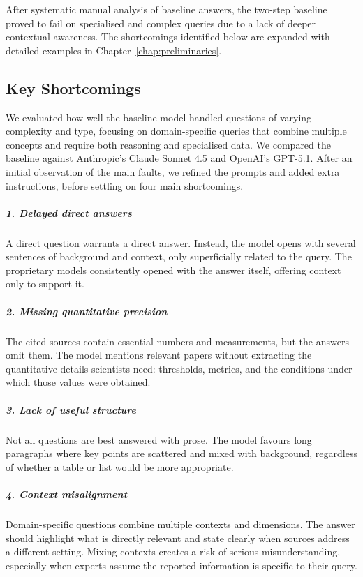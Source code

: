 After systematic manual analysis of baseline answers, the two-step baseline~\citep{elbaff2025earthobservationrag} proved to fail on specialised and complex queries due to a lack of deeper contextual awareness. The shortcomings identified below are expanded with detailed examples in Chapter~\ref{chap:preliminaries}.

\subsection{Key Shortcomings}
\label{subsec:shortcomings}

We evaluated how well the baseline model handled questions of varying complexity and type, focusing on domain-specific queries that combine multiple concepts and require both reasoning and specialised data. We compared the baseline against Anthropic's Claude Sonnet 4.5 and OpenAI's GPT-5.1. After an initial observation of the main faults, we refined the prompts and added extra instructions, before settling on four main shortcomings.

\subparagraph{1. Delayed direct answers}

A direct question warrants a direct answer. Instead, the model opens with several sentences of background and context, only superficially related to the query. The proprietary models consistently opened with the answer itself, offering context only to support it.

\subparagraph{2. Missing quantitative precision}

The cited sources contain essential numbers and measurements, but the answers omit them. The model mentions relevant papers without extracting the quantitative details scientists need: thresholds, metrics, and the conditions under which those values were obtained.

\subparagraph{3. Lack of useful structure}

Not all questions are best answered with prose. The model favours long paragraphs where key points are scattered and mixed with background, regardless of whether a table or list would be more appropriate.

\subparagraph{4. Context misalignment}

Domain-specific questions combine multiple contexts and dimensions. The answer should highlight what is directly relevant and state clearly when sources address a different setting. Mixing contexts creates a risk of serious misunderstanding, especially when experts assume the reported information is specific to their query.

